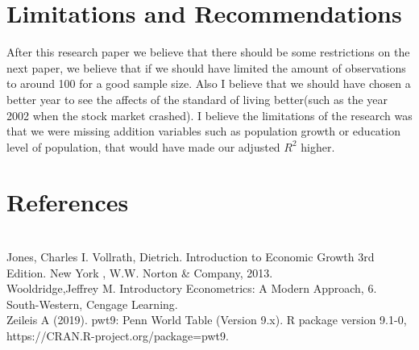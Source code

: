 \documentclass{article}
\begin{document}
\section{Limitations and Recommendations}
After this research paper we believe that there should be some restrictions on the next paper, we believe that if we should have limited the amount of observations to around 100 for a good sample size. Also I believe that we should have chosen a better year to see the affects of the standard of living better(such as the year 2002 when the stock market crashed). I believe the limitations of the research was that we were missing addition variables such as population growth or education level of population, that would have made our adjusted $R^2$ higher.

\section{References}
\\[1]
Jones, Charles I. Vollrath, Dietrich. Introduction to Economic Growth 3rd Edition. New York , W.W. Norton & Company, 2013.
\\[2]
Wooldridge,Jeffrey M. Introductory Econometrics: A Modern Approach, 6. South-Western, Cengage Learning.
\\[3]
Zeileis A (2019). pwt9: Penn World Table (Version 9.x). R package version 9.1-0, https://CRAN.R-project.org/package=pwt9.
\end{document}
